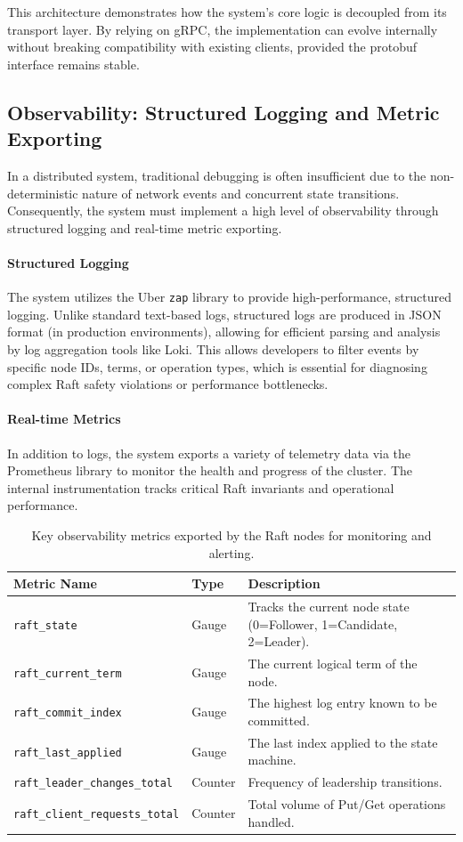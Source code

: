 This architecture demonstrates how the system's core logic is decoupled from its transport layer.
By relying on gRPC, the implementation can evolve internally without breaking compatibility with existing clients, provided the protobuf interface remains stable.

\subsection{Observability: Structured Logging and Metric Exporting}
In a distributed system, traditional debugging is often insufficient due to the non-deterministic nature of network events and concurrent state transitions. Consequently, the system must implement a high level of observability through structured logging and real-time metric exporting.

\paragraph{Structured Logging}
The system utilizes the Uber \texttt{zap} library to provide high-performance, structured logging. Unlike standard text-based logs, structured logs are produced in JSON format (in production environments), allowing for efficient parsing and analysis by log aggregation tools like Loki. This allows developers to filter events by specific node IDs, terms, or operation types, which is essential for diagnosing complex Raft safety violations or performance bottlenecks.

\paragraph{Real-time Metrics}
In addition to logs, the system exports a variety of telemetry data via the Prometheus library to monitor the health and progress of the cluster. The internal instrumentation tracks critical Raft invariants and operational performance.

\begin{table}[h]
\centering
\caption{Key observability metrics exported by the Raft nodes for monitoring and alerting.}
\label{tab:observability_metrics}
\begin{tabular}{|l|l|p{6cm}|}
\hline
\textbf{Metric Name} & \textbf{Type} & \textbf{Description} \\ \hline
\texttt{raft\_state} & Gauge & Tracks the current node state (0=Follower, 1=Candidate, 2=Leader). \\ \hline
\texttt{raft\_current\_term} & Gauge & The current logical term of the node. \\ \hline
\texttt{raft\_commit\_index} & Gauge & The highest log entry known to be committed. \\ \hline
\texttt{raft\_last\_applied} & Gauge & The last index applied to the state machine. \\ \hline
\texttt{raft\_leader\_changes\_total} & Counter & Frequency of leadership transitions. \\ \hline
\texttt{raft\_client\_requests\_total} & Counter & Total volume of Put/Get operations handled. \\ \hline
\end{tabular}
\end{table}


